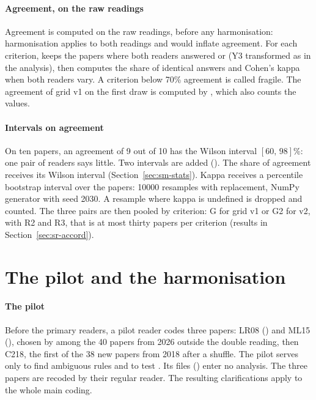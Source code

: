 \paragraph{Agreement, on the raw readings}
Agreement is computed on the raw readings, before any harmonisation: harmonisation applies to both
readings and would inflate agreement. For each criterion,  keeps the papers
where both readers answered  or  (Y3 transformed as in the analysis), then computes
the share of identical answers and Cohen's kappa when both readers vary. A criterion below 70\%
agreement is called fragile. The agreement of grid v1 on the first draw is computed by
, which also counts the  values.

\paragraph{Intervals on agreement}
On ten papers, an agreement of 9 out of 10 has the Wilson interval $[60,\,98]$\%: one pair of
readers says little. Two intervals are added (). The share of agreement receives its Wilson interval
(Section~\ref{sec:sm-stats}). Kappa receives a percentile bootstrap interval over the papers:
\num{10000} resamples with replacement, NumPy generator with seed 2030. A resample where kappa is
undefined is dropped and counted. The three pairs are then pooled by criterion: G for grid v1 or G2
for v2, with R2 and R3, that is at most thirty papers per criterion
(results in Section~\ref{sec:sr-accord}).

\section{The pilot and the harmonisation}\label{sec:sm-harmonisation}

\paragraph{The pilot}
Before the primary readers, a pilot reader codes three papers: LR08 () and
ML15 (), chosen by  among the 40 papers from 2026 outside the
double reading, then C218, the first of the 38 new papers from 2018 after a 
shuffle. The pilot serves only to find ambiguous rules and to test . Its files
() enter no analysis. The three papers are recoded by their regular reader.
The resulting clarifications apply to the whole main coding.

